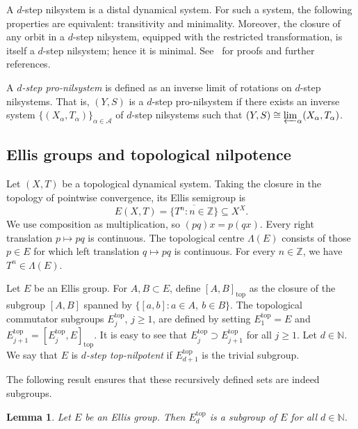 \documentclass[11pt]{amsart}
\newtheorem{lemma}[theorem]{Lemma}
\theoremstyle{definition}
\theoremstyle{remark}
\newcommand{\Z}{\mathbb Z}
\begin{document}
A $d$-step nilsystem is a distal dynamical system. For such a system, the following properties are equivalent: transitivity and minimality. Moreover, the closure of any orbit in a $d$-step nilsystem, equipped with the restricted transformation, is itself a $d$-step nilsystem; hence it is minimal. See~\cite{AGH-1963} for proofs and further references.

A \emph{$d$-step pro-nilsystem} is defined as an inverse limit of rotations on $d$-step nilsystems. That is, $(Y, S)$ is a $d$-step pro-nilsystem if there exists an inverse system $\{(X_\alpha, T_\alpha)\}_{\alpha \in \mathcal{A}}$ of $d$-step nilsystems such that $(Y, S) \cong \varprojlim_{\alpha} (X_\alpha, T_\alpha)$.


\subsection{Ellis groups and topological nilpotence}\label{sec:ellis}

Let $(X,T)$ be a topological dynamical system.
Taking the closure in the topology of pointwise convergence, its Ellis semigroup is
\[
 E(X,T)=\overline{\{T^n:n\in\Z\}}\subseteq X^X.
\]
We use composition as multiplication, so $(pq)x=p(qx)$.  Every right translation
$p\mapsto pq$ is continuous.  The topological centre $\Lambda(E)$ consists
of those $p\in E$ for which left translation $q\mapsto pq$ is continuous.
For every $n\in\Z$, we have $T^n\in\Lambda(E)$.






Let $E$ be an Ellis group. For $A, B \subset E$, define $ [A, B]_{\mathrm{top}}$ as the closure of the subgroup $[A, B]$ spanned by $\{[a, b] : a \in A,\ b \in B\}$.
The topological commutator subgroups $E_j^{\mathrm{top}}$, $j \geq 1$, are defined by setting
$E_1^{\mathrm{top}} = E$ and $E_{j+1}^{\mathrm{top}} = [E_j^{\mathrm{top}}, E]_{\mathrm{top}}$.
It is easy to see that $E_j^{\mathrm{top}} \supset E_{j+1}^{\mathrm{top}}$ for all $j \geq 1$.
Let $d \in \mathbb{N}$. We say that $E$ is \emph{$d$-step top-nilpotent} if $E_{d+1}^{\mathrm{top}}$ is the trivial subgroup.

 The following result ensures that these recursively defined sets are indeed subgroups.
\begin{lemma}\cite{QiuZhao2022} \label{E_d^top subgroup}
  Let $E$ be an Ellis group. Then $E_d^{\mathrm{top}}$ is a subgroup of $E$ for all $d \in \mathbb{N}$.
\end{lemma}
\end{document}
